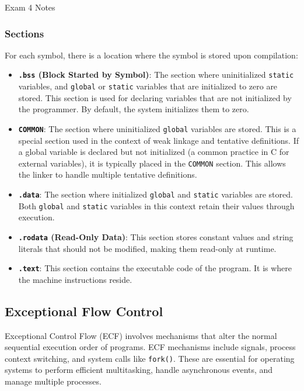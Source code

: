 \begin{examnotes}{Exam 4 Notes}
\begin{highlight}
        \subsubsection*{Sections}

        For each symbol, there is a location where the symbol is stored upon compilation:

        \begin{itemize}
            \item \textbf{\texttt{.bss} (Block Started by Symbol)}: The section where uninitialized \texttt{static} variables, and \texttt{global} or \texttt{static} variables that are initialized to 
            zero are stored. This section is used for declaring variables that are not initialized by the programmer. By default, the system initializes them to zero. 
            \item \textbf{\texttt{COMMON}}: The section where uninitialized \texttt{global} variables are stored. This is a special section used in the context of weak linkage and tentative definitions. 
            If a global variable is declared but not initialized (a common practice in C for external variables), it is typically placed in the \texttt{COMMON} section. This allows the linker to handle 
            multiple tentative definitions.
            \item \textbf{\texttt{.data}}: The section where initialized \texttt{global} and \texttt{static} variables are stored. Both \texttt{global} and \texttt{static} variables in this context retain
            their values through execution.
            \item \textbf{\texttt{.rodata} (Read-Only Data)}: This section stores constant values and string literals that should not be modified, making them read-only at runtime.
            \item \textbf{\texttt{.text}}: This section contains the executable code of the program. It is where the machine instructions reside.
        \end{itemize}
    \end{highlight}

    \subsection*{Exceptional Flow Control}

    Exceptional Control Flow (ECF) involves mechanisms that alter the normal sequential execution order of programs. ECF mechanisms include signals, process context switching, and system calls like 
    \texttt{fork()}. These are essential for operating systems to perform efficient multitasking, handle asynchronous events, and manage multiple processes.


\end{examnotes}

